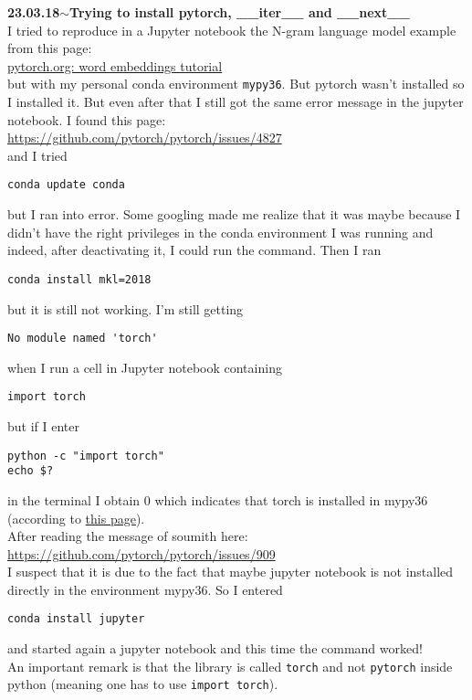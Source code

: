 \documentclass[11pt,a4paper]{article}
\newenvironment{loggentry}[2]%
{\noindent\textbf{#1}\hspace{1cm}$\mathbf{\sim}$\text{ }\textbf{#2}\\}{\vspace{0.5cm}}
\begin{document}
\begin{loggentry}{23.03.18}{Trying to install pytorch, \_\_iter\_\_ and \_\_next\_\_}
I tried to reproduce in a Jupyter notebook the N-gram language model example from this page:\\
\href{http://pytorch.org/tutorials/beginner/nlp/word_embeddings_tutorial.html}{pytorch.org: word embeddings tutorial}\\
but with my personal conda environment \texttt{mypy36}. But pytorch wasn't installed so I installed it. But even after that I still got the same error message in the jupyter notebook. I found this page:\\
\url{https://github.com/pytorch/pytorch/issues/4827}\\
and I tried
\begin{verbatim}
conda update conda
\end{verbatim}
but I ran into error. Some googling made me realize that it was maybe because I didn't have the right privileges in the conda environment I was running and indeed, after deactivating it, I could run the command. Then I ran
\begin{verbatim}
conda install mkl=2018
\end{verbatim}
but it is still not working. I'm still getting
\begin{verbatim}
No module named 'torch'
\end{verbatim}
when I run a cell in Jupyter notebook containing
\begin{verbatim}
import torch
\end{verbatim}
but if I enter
\begin{verbatim}
python -c "import torch"
echo $?
\end{verbatim}
in the terminal I obtain 0 which indicates that torch is installed in mypy36 (according to \href{https://askubuntu.com/questions/588390/how-do-i-check-whether-a-module-is-installed-or-not-in-python}{this page}).\\
After reading the message of soumith here:\\
\url{https://github.com/pytorch/pytorch/issues/909}\\
I suspect that it is due to the fact that maybe jupyter notebook is not installed directly in the environment mypy36. So I entered
\begin{verbatim}
conda install jupyter
\end{verbatim}
and started again a jupyter notebook and this time the command worked!\\
An important remark is that the library is called \texttt{torch} and not \texttt{pytorch} inside python (meaning one has to use \texttt{import torch}).\\


\end{loggentry}
\end{document}
